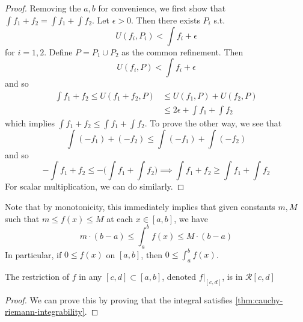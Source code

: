   \begin{proof}
    Removing the $a, b$ for convenience, we first show that $\int f_1 + f_2 = \int f_1 + \int f_2$. Let $\epsilon > 0$. Then there exists $P_i$ s.t. 
    \begin{equation}
      U(f_i, P_i) < \int f_i + \epsilon
    \end{equation}
    for $i = 1, 2$. Define $P = P_1 \cup P_2$ as the common refinement. Then 
    \begin{equation}
      U(f_i, P) < \int f_i + \epsilon
    \end{equation} 
    and so 
    \begin{align}
      \int f_1 + f_2 \leq U(f_1 + f_2, P) & \leq U(f_1, P) + U(f_2, P) \\ 
                                          & \leq 2 \epsilon + \int f_1 + \int f_2
    \end{align}
    which implies $\int f_1 + f_2 \leq \int f_1 + \int f_2$. To prove the other way, we see that 
    \begin{equation}
      \int (-f_1) + (-f_2) \leq \int (-f_1) + \int (-f_2) 
    \end{equation}
    and so 
    \begin{equation}
      - \int f_1 + f_2 \leq - \bigg( \int f_1 + \int f_2 \bigg) \implies \int f_1 + f_2 \geq \int f_1 + \int f_2
    \end{equation}
    For scalar multiplication, we can do similarly. 
  \end{proof}

  Note that by monotonicity, this immediately implies that given constants $m, M$ such that $m \leq f(x) \leq M$ at each $x \in [a, b]$, we have
  \begin{equation}
    m \cdot (b - a) \leq \int_a^b f(x) \leq M \cdot (b-a)
  \end{equation}
  In particular, if $0 \leq f(x)$ on $[a, b]$, then $0 \leq \int_a^b f(x)$. 
  
  \begin{theorem}
    \label{thm:restrictions-of-integrable-functions}
    The restriction of $f$ in any $[c, d] \subset [a, b]$, denoted $f \big|_{[c,d]}$, is in $\mathcal{R}[c,d]$
  \end{theorem}
  \begin{proof}
    We can prove this by proving that the integral satisfies \ref{thm:cauchy-riemann-integrability}. 
  \end{proof}

